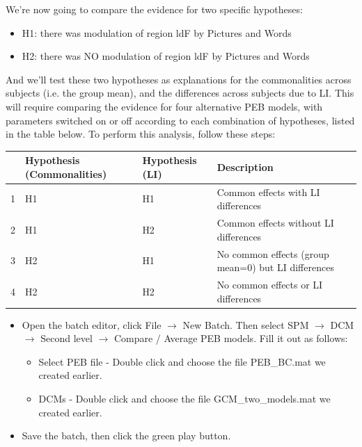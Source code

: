 \documentclass{article}
\begin{document}
We're now going to compare the evidence for two specific hypotheses:

\begin{itemize}
    \item H1: there was modulation of region ldF by Pictures and Words
    \item H2: there was NO modulation of region ldF by Pictures and Words
\end{itemize}

And we'll test these two hypotheses as explanations for the commonalities across subjects (i.e. the group mean), and the differences across subjects due to LI. This will require comparing the evidence for four alternative PEB models, with parameters switched on or off according to each combination of hypotheses, listed in the table below. To perform this analysis, follow these steps:

\begin{table}[]
\begin{tabular}{|l|l|l|p{6cm}|}
\hline
 & \textbf{Hypothesis (Commonalities)} & \textbf{Hypothesis (LI)} & \textbf{Description}                             \\ \hline
1              & H1                     & H1          & Common effects with LI differences                                   \\ \hline
2              & H1                     & H2          & Common effects without LI differences \\ \hline
3              & H2                     & H1          & No common effects (group mean=0) but LI differences        \\ \hline
4              & H2                     & H2          & No common effects or LI differences         \\ \hline
\end{tabular}
\end{table}

\begin{itemize}
    \item Open the batch editor, click File $\rightarrow$ New Batch. Then select SPM $\rightarrow$ DCM $\rightarrow$ Second level $\rightarrow$ Compare / Average PEB models. Fill it out as follows:
    \begin{itemize}
        \item Select PEB file - Double click and choose the file PEB\_BC.mat we created earlier.
        \item DCMs - Double click and choose the file GCM\_two\_models.mat we created earlier.
    \end{itemize}
    \item Save the batch, then click the green play button.
\end{itemize}
\end{document}
